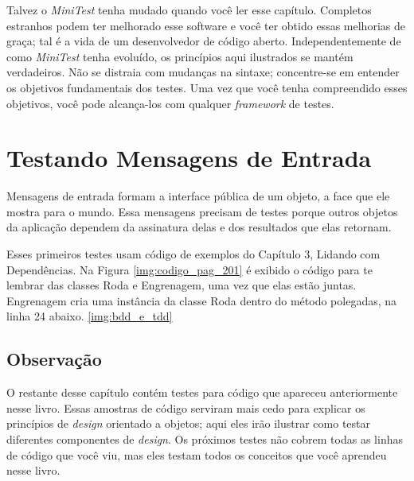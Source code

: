 Talvez o \textit{MiniTest} tenha mudado quando você ler esse capítulo. Completos estranhos podem ter melhorado esse software e você ter obtido essas melhorias de graça; tal é a vida de um desenvolvedor de código aberto. Independentemente de como \textit{MiniTest} tenha evoluído, os princípios aqui ilustrados se mantém verdadeiros. Não se distraia com mudanças na sintaxe; concentre-se em entender os objetivos fundamentais dos testes. Uma vez que você tenha compreendido esses objetivos, você pode alcança-los com qualquer \textit{framework} de testes.

\section{Testando Mensagens de Entrada}

Mensagens de entrada formam a interface pública de um objeto, a face que ele mostra para o mundo. Essa mensagens precisam de testes porque outros objetos da aplicação dependem da assinatura delas e dos resultados que elas retornam.

Esses primeiros testes usam código de exemplos do Capítulo 3, Lidando com Dependências. Na Figura \ref{img:codigo_pag_201} é exibido o código para te lembrar das classes Roda e Engrenagem, uma vez que elas estão juntas. Engrenagem cria uma instância da classe Roda dentro do método polegadas, na linha 24 abaixo.
\ref{img:bdd_e_tdd}
\subsection{Observação}
O restante desse capítulo contém testes para código que apareceu anteriormente nesse livro. Essas amostras de código serviram mais cedo para explicar os princípios de \textit{design} orientado a objetos; aqui eles irão ilustrar como testar diferentes componentes de \textit{design}. Os próximos testes não cobrem todas as linhas de código que você viu, mas eles testam todos os conceitos que você aprendeu nesse livro.

